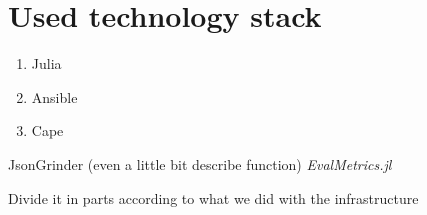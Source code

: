 \chapter{Used technology stack} \label{app:technologies}
\begin{enumerate}
    \item Julia
    \item Ansible
    \item Cape
\end{enumerate}


JsonGrinder (even a little bit describe function)
\emph{EvalMetrics.jl}

Divide it in parts according to what we did with the infrastructure


